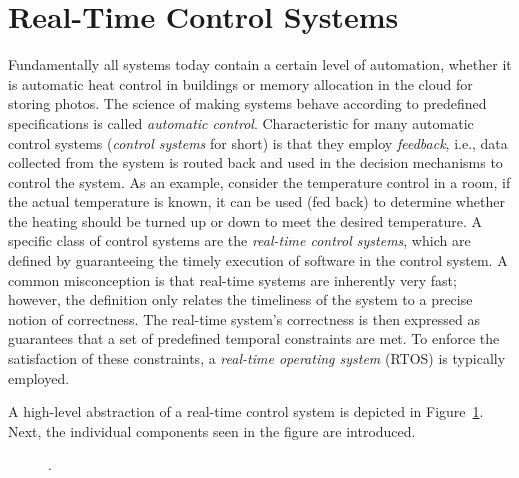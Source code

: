 \section{Real-Time Control Systems}%
\label{sec:intro:rts}%
%
%
Fundamentally all systems today contain a certain level of automation, whether it is automatic heat control in buildings or memory allocation in the cloud for storing photos.
The science of making systems behave according to predefined specifications is called \emph{automatic control}.
Characteristic for many automatic control systems (\emph{control systems} for short) is that they employ \emph{feedback}, i.e., data collected from the system is routed back and used in the decision mechanisms to control the system.
As an example, consider the temperature control in a room, if the actual temperature is known, it can be used (fed back) to determine whether the heating should be turned up or down to meet the desired temperature.
A specific class of control systems are the \emph{real-time control systems}, which are defined by guaranteeing the timely execution of software in the control system.
A common misconception is that real-time systems are inherently very fast; however, the definition only relates the timeliness of the system to a precise notion of correctness.
The real-time system's correctness is then expressed as guarantees that a set of predefined temporal constraints are met.
To enforce the satisfaction of these constraints, a \emph{real-time operating system} (RTOS) is typically employed.

A high-level abstraction of a real-time control system is depicted in Figure~\ref{fig:high-level-abstraction}.
Next, the individual components seen in the figure are introduced. 
%
\begin{figure}[t]
    \centering
    \caption{.}%
    \label{fig:high-level-abstraction}%
\end{figure}

